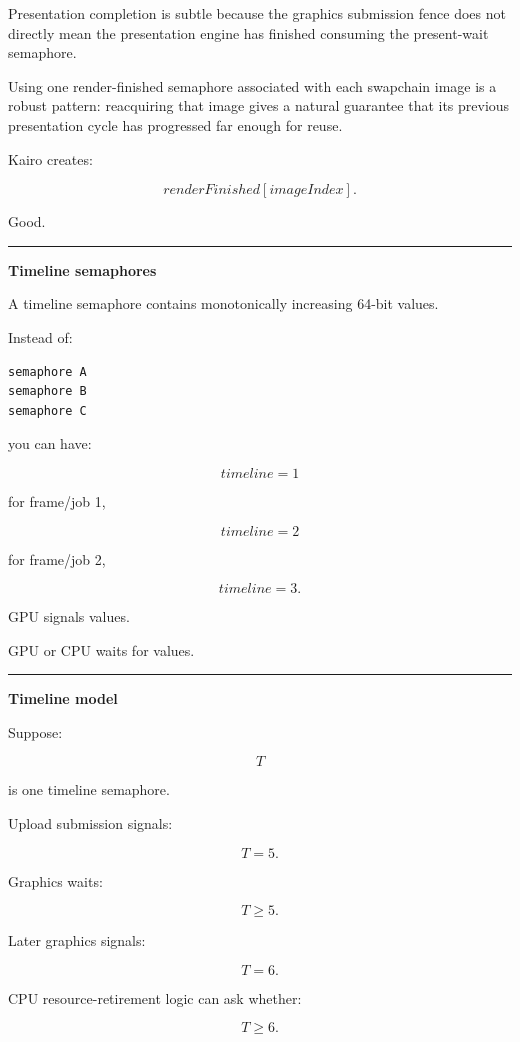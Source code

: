Presentation completion is subtle because the graphics submission fence does not directly mean the presentation engine has finished consuming the present-wait semaphore.

Using one render-finished semaphore associated with each swapchain image is a robust pattern: reacquiring that image gives a natural guarantee that its previous presentation cycle has progressed far enough for reuse.

Kairo creates:

\[
renderFinished[imageIndex].
\]

Good.

\begin{center}\rule{0.5\linewidth}{0.5pt}\end{center}

\textbf{Timeline semaphores}

A timeline semaphore contains monotonically increasing 64-bit values.

Instead of:

\begin{verbatim}
semaphore A
semaphore B
semaphore C
\end{verbatim}

you can have:

\[
timeline=1
\]

for frame/job 1,

\[
timeline=2
\]

for frame/job 2,

\[
timeline=3.
\]

GPU signals values.

GPU or CPU waits for values.

\begin{center}\rule{0.5\linewidth}{0.5pt}\end{center}

\textbf{Timeline model}

Suppose:

\[
T
\]

is one timeline semaphore.

Upload submission signals:

\[
T=5.
\]

Graphics waits:

\[
T\ge5.
\]

Later graphics signals:

\[
T=6.
\]

CPU resource-retirement logic can ask whether:

\[
T\ge6.
\]

